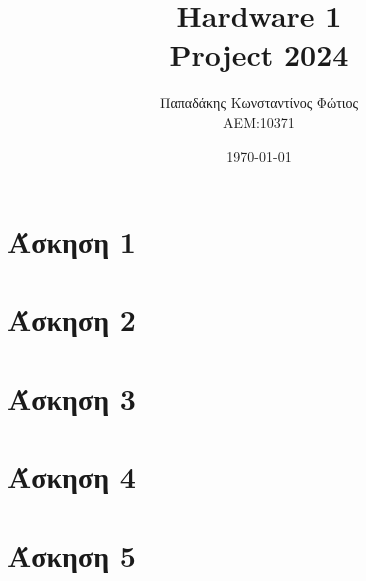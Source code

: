 \documentclass{report}
\begin{document}

\title{\Huge \bfseries {} Hardware 1 \\ Project 2024} %
\author{Παπαδάκης Κωνσταντίνος Φώτιος\vspace{0.5cm} \\  ΑΕΜ:10371} %
\date{\today}
\maketitle

\section*{Άσκηση 1}


\section*{Άσκηση 2}


\section*{Άσκηση 3}


\section*{Άσκηση 4}


\section*{Άσκηση 5}

\end{document}
